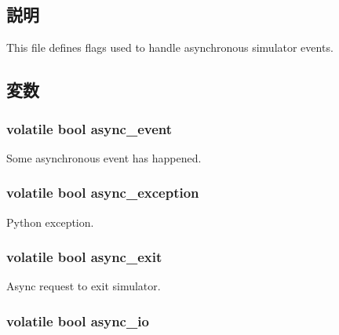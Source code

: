 \subsection{説明}
This file defines flags used to handle asynchronous simulator events. 

\subsection{変数}
\hypertarget{async_8hh_a57c3b44f29e475ec6335a9e50d41e475}{
\subsubsection[{async\_\-event}]{\setlength{\rightskip}{0pt plus 5cm}volatile bool {\bf async\_\-event}}}
\label{async_8hh_a57c3b44f29e475ec6335a9e50d41e475}


Some asynchronous event has happened. \hypertarget{async_8hh_a59ce3c841db7ca8545a8942128e3019a}{
\subsubsection[{async\_\-exception}]{\setlength{\rightskip}{0pt plus 5cm}volatile bool {\bf async\_\-exception}}}
\label{async_8hh_a59ce3c841db7ca8545a8942128e3019a}


Python exception. \hypertarget{async_8hh_ae5b6da2b5697b92c26bd768281b4b1f3}{
\subsubsection[{async\_\-exit}]{\setlength{\rightskip}{0pt plus 5cm}volatile bool {\bf async\_\-exit}}}
\label{async_8hh_ae5b6da2b5697b92c26bd768281b4b1f3}


Async request to exit simulator. \hypertarget{async_8hh_a24b042c9473a660dca598c7da33413b6}{
\subsubsection[{async\_\-io}]{\setlength{\rightskip}{0pt plus 5cm}volatile bool {\bf async\_\-io}}}
\label{async_8hh_a24b042c9473a660dca598c7da33413b6}


